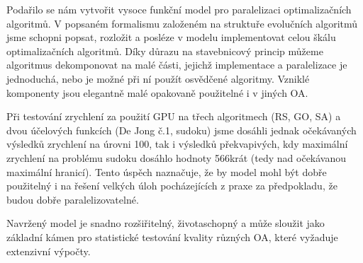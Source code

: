 
Podařilo se nám vytvořit vysoce funkční model pro paralelizaci optimalizačních algoritmů. V popsaném formalismu založeném na struktuře evolučních algoritmů jsme schopni popsat, rozložit a posléze v modelu implementovat celou škálu optimalizačních algoritmů. Díky důrazu na stavebnicový princip můžeme algoritmus dekomponovat na malé části, jejichž implementace a paralelizace je jednoduchá, nebo je možné při ní použít osvědčené algoritmy. Vzniklé komponenty jsou elegantně malé opakovaně použitelné i v jiných OA. 

Při testování zrychlení za použití GPU na třech algoritmech (RS, GO, SA) a dvou účelových funkcích (De Jong č.1, sudoku) jsme dosáhli jednak očekávaných výsledků zrychlení na úrovni 100, tak i výsledků překvapivých, kdy maximální zrychlení na problému sudoku dosáhlo hodnoty 566krát (tedy nad očekávanou maximální hranicí). Tento úspěch naznačuje, že by model mohl být dobře použitelný i na řešení velkých úloh pocházejících z praxe za předpokladu, že budou dobře paralelizovatelné. 

Navržený model je snadno rozšiřitelný, životaschopný a může sloužit jako základní kámen pro statistické testování kvality různých OA, které vyžaduje extenzivní výpočty.  